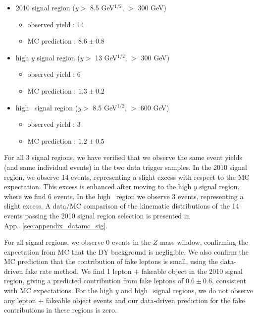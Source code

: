 \begin{itemize}
\item 2010 signal region ($y >$ 8.5 GeV$^{1/2}$, \Ht $>$ 300 GeV)
   \begin{itemize} 
   \item observed yield : 14 
   \item MC prediction  : $8.6 \pm 0.8$
   \end{itemize}  
\item high $y$ signal region ($y >$ 13 GeV$^{1/2}$, \Ht $>$ 300 GeV)
   \begin{itemize} 
   \item observed yield : 6 
   \item MC prediction  : $1.3 \pm 0.2$
   \end{itemize}  
\item high \Ht\ signal region ($y >$ 8.5 GeV$^{1/2}$, \Ht $>$ 600 GeV)
   \begin{itemize} 
   \item observed yield : 3 
   \item MC prediction  : $1.2 \pm 0.5$
   \end{itemize}  
\end{itemize}

For all 3 signal regions, we have verified that we observe the same
event yields (and same individual events) in the two data trigger samples.
In the 2010 signal region, we observe 14 events, representing 
a slight excess with respect to the MC expectation. This excess is enhanced
after moving to the high $y$ signal region, where we find 6 events. 
In the high \Ht\ region we observe 3 events, representing a slight excess.
A data/MC comparison of the kinematic distributions of the 14 events passing
the 2010 signal region selection is presented in App.~\ref{sec:appendix_datamc_sig}.

For all signal regions, we observe 0 events in the $Z$ mass window,
confirming the expectation from MC that the 
DY background is negligible. We also confirm the MC prediction that
the contribution of fake leptons is small, using the data-driven fake
rate method. We find 1 lepton + fakeable object in the 2010 signal region,
giving a predicted contribution from fake leptons of $0.6 \pm 0.6$, consistent
with MC expectations. For the high $y$ and high \Ht\ signal regions, we do
not observe any lepton + fakeable object events and our data-driven prediction
for the fake contributions in these regions is zero.



